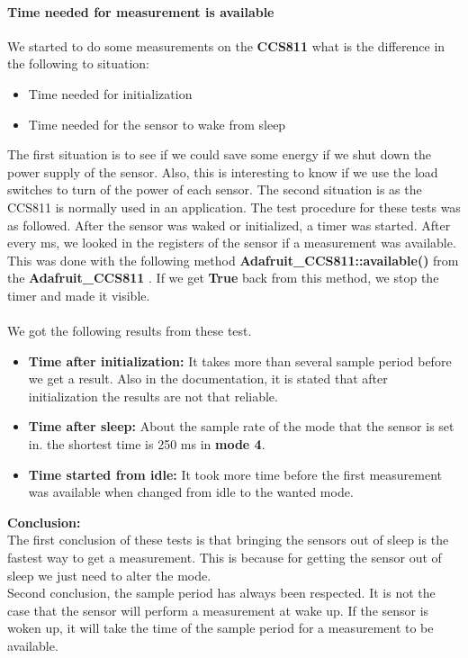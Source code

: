 \documentclass[11pt,a4paper]{article}
\begin{document}
\paragraph{Time needed for measurement is available}
We started to do some measurements on the \textbf{CCS811} what is the difference in the following to situation:
\begin{itemize}
	\item Time needed for initialization
	\item Time needed for the sensor to wake from sleep
\end{itemize}
The first situation is to see if we could save some energy if we shut down the power supply of the sensor. Also, this is interesting to know if we use the load switches to turn of the power of each sensor. The second situation is as the CCS811 is normally used in an application. The test procedure for these tests was as followed. After the sensor was waked or initialized, a timer was started. After every ms, we looked in the registers of the sensor if a measurement was available. This was done with the following method \textbf{Adafruit\_CCS811::available()} from the \textbf{Adafruit\_CCS811} \cite{lib_CCS811} . If we get \textbf{True} back from this method, we stop the timer and made it visible.
\\ \\
We got the following results from these test.
\begin{itemize}
\item \textbf{Time after initialization:} It takes more than several sample period before we get a result. Also in the documentation, it is stated that after initialization the results are not that reliable.
\item \textbf{Time after sleep:} About the sample rate of the mode that the sensor is set in. the shortest time is 250 ms in \textbf{mode 4}. 
\item \textbf{ Time started from idle:} It took more time before the first measurement was available when changed from idle to the wanted mode.
\end{itemize}
\textbf{Conclusion:} \\ The first conclusion of these tests is that bringing the sensors out of sleep is the fastest way to get a measurement. This is because for getting the sensor out of sleep we just need to alter the mode. 
\\ Second conclusion, the sample period has always been respected. It is not the case that the sensor will perform a measurement at wake up. If the sensor is woken up, it will take the time of the sample period for a measurement to be available.
\end{document}
